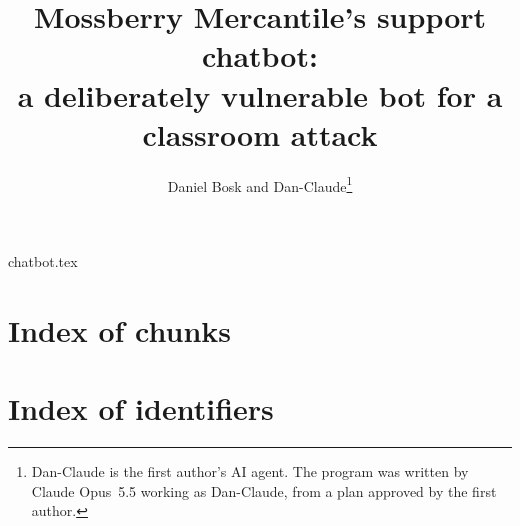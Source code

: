 \documentclass[a4paper,11pt,oneside]{memoir}
\title{Mossberry Mercantile's support chatbot:\\
  a deliberately vulnerable bot for a classroom attack}
\author{Daniel Bosk and Dan-Claude\thanks{%
  Dan-Claude is the first author's AI agent.  The program was written
  by Claude Opus~5.5 working as Dan-Claude, from a plan approved by
  the first author.}}
\begin{document}
\maketitle
\tableofcontents*

{chatbot.tex}

\printbibliography

\chapter*{Index of chunks}
\nowebchunks

\chapter*{Index of identifiers}
\nowebindex
\end{document}
